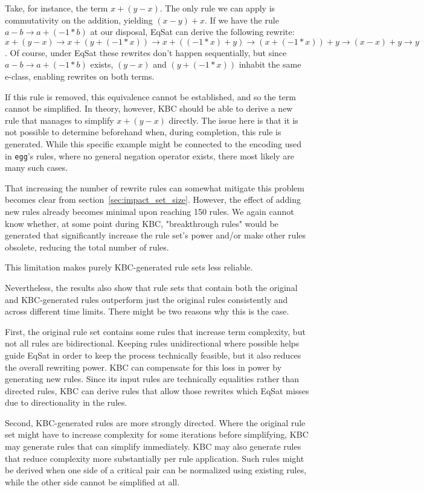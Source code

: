 Take, for instance, the term $x + (y - x)$. The only rule we can apply is commutativity on the addition, yielding $(x - y) + x$.  If we have the rule $a - b \to a + (-1 * b)$ at our disposal, EqSat can derive the following rewrite: $x + (y - x) \to x + (y + (-1 * x)) \to x + ((-1 * x) + y) \to (x + (-1 * x)) + y \to (x - x) + y \to y$. Of course, under EqSat these rewrites don't happen sequentially, but since $a - b \to a + (-1 * b)$ exists, $(y - x)$ and $(y + (-1 * x))$ inhabit the same e-class, enabling rewrites on both terms.

If this rule is removed, this equivalence cannot be established, and so the term cannot be simplified. In theory, however, KBC should be able to derive a new rule that manages to simplify $x + (y - x)$ directly. The issue here is that it is not possible to determine beforehand when, during completion, this rule is generated. While this specific example might be connected to the encoding used in \texttt{egg}'s rules, where no general negation operator exists, there most likely are many such cases.

That increasing the number of rewrite rules can somewhat mitigate this problem becomes clear from section~\ref{sec:impact_set_size}. However, the effect of adding new rules already becomes minimal upon reaching 150 rules. We again cannot know whether, at some point during KBC, "breakthrough rules" would be generated that significantly increase the rule set's power and/or make other rules obsolete, reducing the total number of rules.

This limitation makes purely KBC-generated rule sets less reliable.

Nevertheless, the results also show that rule sets that contain both the original and KBC-generated rules outperform just the original rules consistently and across different time limits. There might be two reasons why this is the case.

First, the original rule set contains some rules that increase term complexity, but not all rules are bidirectional. Keeping rules unidirectional where possible helps guide EqSat in order to keep the process technically feasible, but it also reduces the overall rewriting power. KBC can compensate for this loss in power by generating new rules. Since its input rules are technically equalities rather than directed rules, KBC can derive rules that allow those rewrites which EqSat misses due to directionality in the rules. 

Second, KBC-generated rules are more strongly directed. Where the original rule set might have to increase complexity for some iterations before simplifying, KBC may generate rules that can simplify immediately. KBC may also generate rules that reduce complexity more substantially per rule application. Such rules might be derived when one side of a critical pair can be normalized using existing rules, while the other side cannot be simplified at all. 

